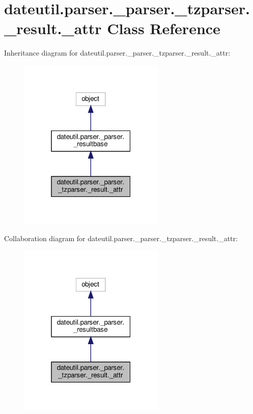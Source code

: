 \hypertarget{classdateutil_1_1parser_1_1__parser_1_1__tzparser_1_1__result_1_1__attr}{}\section{dateutil.\+parser.\+\_\+parser.\+\_\+tzparser.\+\_\+result.\+\_\+attr Class Reference}
\label{classdateutil_1_1parser_1_1__parser_1_1__tzparser_1_1__result_1_1__attr}


Inheritance diagram for dateutil.\+parser.\+\_\+parser.\+\_\+tzparser.\+\_\+result.\+\_\+attr\+:
\nopagebreak
\begin{figure}[H]
\begin{center}
\leavevmode
\includegraphics[width=196pt]{classdateutil_1_1parser_1_1__parser_1_1__tzparser_1_1__result_1_1__attr__inherit__graph}
\end{center}
\end{figure}


Collaboration diagram for dateutil.\+parser.\+\_\+parser.\+\_\+tzparser.\+\_\+result.\+\_\+attr\+:
\nopagebreak
\begin{figure}[H]
\begin{center}
\leavevmode
\includegraphics[width=196pt]{classdateutil_1_1parser_1_1__parser_1_1__tzparser_1_1__result_1_1__attr__coll__graph}
\end{center}
\end{figure}
